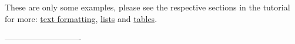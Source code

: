 \documentclass[
  12pt,
  a4paper,
]{article}
\begin{document}
\newpage{}

These are only some examples, please see the respective sections in the tutorial for more: \href{https://www.overleaf.com/learn/latex/Bold%2C_italics_and_underlining}{text formatting}, \href{https://www.overleaf.com/learn/latex/Lists}{lists} and \href{https://www.overleaf.com/learn/latex/Tables}{tables}.


----------------------------%

\newpage{}
\printbibliography[
heading=bibintoc,
title={References} %
]
\end{document}
